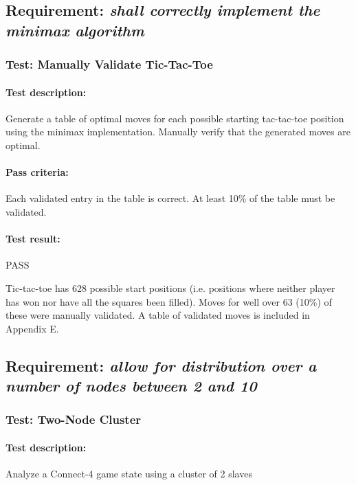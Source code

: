 \documentclass[pdftex,12pt,a4paper]{article}
\begin{document}

\subsection{\textbf{Requirement:} \emph{shall correctly implement the minimax algorithm}}\label{sec:req-correctness}

\subsubsection{\textbf{Test:} Manually Validate Tic-Tac-Toe}

\paragraph{Test description:} Generate a table of optimal moves for each possible starting tac-tac-toe position using the minimax implementation. Manually verify that the generated moves are optimal.

\paragraph{Pass criteria:} Each validated entry in the table is correct. At least 10\% of the table must be validated.

\paragraph{Test result:} PASS

Tic-tac-toe has 628 possible start positions (i.e. positions where neither player has won nor have all the squares been filled). Moves for well over 63 (10\%) of these were manually validated. A table of validated moves is included in Appendix E.

\subsection{\textbf{Requirement:} \emph{allow for distribution over a number of nodes between 2 and 10}}

\subsubsection{\textbf{Test:} Two-Node Cluster}

\paragraph{Test description:} Analyze a Connect-4 game state using a cluster of 2 slaves
\end{document}
